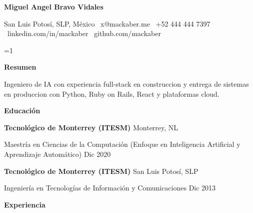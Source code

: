 \documentclass[11pt]{article}
\providecommand{\CVProfile}{ai-engineer}
\providecommand{\IncludeSummary}{1}
\newcommand{\ProfileSwitch}[3]{%
    \ifstrequal{\CVProfile}{academic}{#1}{%
        \ifstrequal{\CVProfile}{fullstack-engineer}{#2}{#3}%
    }%
}
\newcommand{\ProfileSummary}{\ProfileSwitch{
M.C. en Ciencias de la Computacion con experiencia docente y de mentoria, enfocado en educacion de IA/ML y proyectos aplicados que conectan investigacion y producto.
}{
Ingeniero full-stack con experiencia en construccion y entrega de plataformas en produccion, integrando backend, frontend e infraestructura cloud.
}{
Ingeniero de IA con experiencia full-stack en construccion y entrega de sistemas en produccion con Python, Ruby on Rails, React y plataformas cloud.
}}
\begin{document}
\begin{center}
    \textbf{\LARGE Miguel Angel Bravo Vidales}\\ 
    \vspace{4pt}
    \hrulefill
\end{center}

\begin{center}
    San Luis Potosí, SLP, México \textbullet \ x@mackaber.me \textbullet \ +52 444 444 7397 \textbullet \ linkedin.com/in/mackaber \textbullet \ github.com/mackaber
\end{center}

\ifnum\IncludeSummary=1
\vspace{6pt}
\begin{center}
    \textbf{Resumen}
\end{center}
\ProfileSummary
\fi

\vspace{0.5pt}

\begin{center}
    \textbf{Educación}
\end{center}
\textbf{Tecnológico de Monterrey (ITESM)} \hfill Monterrey, NL

\ProfileSwitch{
Maestría en Ciencias Computacionales \hfill 2018 -- 2019
}{
Maestría en Ciencias de la Computación \hfill Dic 2020
}{
Maestría en Ciencias de la Computación (Enfoque en Inteligencia Artificial y Aprendizaje Automático) \hfill Dic 2020
}

\vspace{10pt}

\textbf{Tecnológico de Monterrey (ITESM)} \hfill San Luis Potosí, SLP

\ProfileSwitch{
Ingeniería en Tecnologías de Información y Comunicaciones (ITIC) \hfill 2009 -- 2013
\begin{itemize}[noitemsep, topsep=2pt, partopsep=0pt, parsep=0pt]
    \item Premio DAE ``Al desarrollo estudiantil''
    \item Premio ``CENEVAL al Desempeño de Excelencia-EGEL'' (2014)
\end{itemize}
}{
Ingeniería en Tecnologías de Información y Comunicaciones \hfill Dic 2013
}{
Ingeniería en Tecnologías de Información y Comunicaciones \hfill Dic 2013
}

\vspace{12pt}

\begin{center}
    \textbf{Experiencia}
\end{center}
\end{document}
